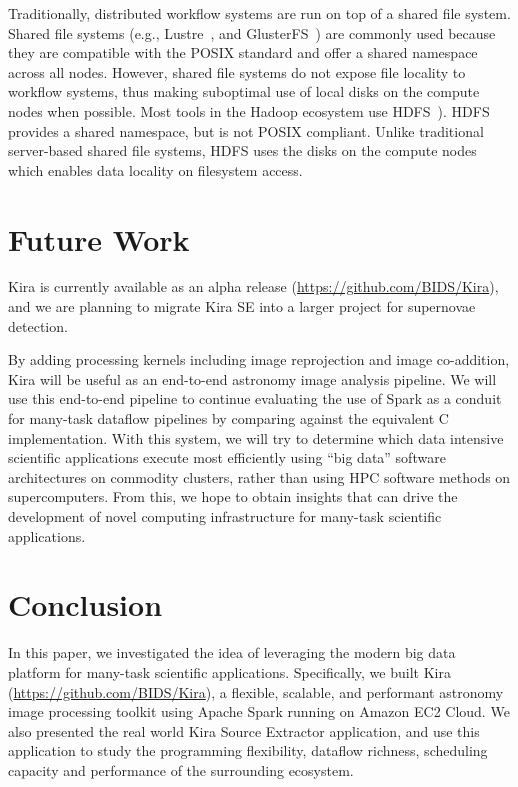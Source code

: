 \documentclass[10pt,journal,compsoc]{IEEEtran}
\begin{document}
Traditionally, distributed workflow systems are run on top of a shared file system. 
Shared file systems (e.g., Lustre~\cite{donovan03}, and
GlusterFS~\cite{davies13}) are commonly used because they are compatible with the POSIX
standard and offer a shared namespace across all nodes. However, shared file systems
do not expose file locality to workflow systems, thus making suboptimal use of local
disks on the compute nodes when possible. Most tools in the Hadoop ecosystem use
HDFS~\cite{shvachko10}). HDFS  provides a shared namespace, but is not POSIX
compliant. Unlike traditional server-based shared file systems, HDFS uses
the disks on the compute nodes which enables data locality on filesystem access.

\section{Future Work}
\label{sec:Future}
Kira is currently available as an alpha release (\url{https://github.com/BIDS/Kira}), 
and we are planning to migrate Kira SE into a larger project for supernovae detection.

By adding processing kernels including image reprojection and image co-addition, Kira will be
useful as an end-to-end astronomy image analysis pipeline. We will use this end-to-end pipeline
to continue evaluating the use of Spark as a conduit for many-task dataflow pipelines by
comparing against the equivalent C implementation. With this system, we will try to determine
which data intensive scientific applications execute most efficiently using ``big data''
software architectures on commodity clusters, rather than using HPC software methods on supercomputers.
From this, we hope to obtain insights that can drive the development of novel computing
infrastructure for many-task scientific applications.

\section{Conclusion}
\label{sec:Conclusion}

In this paper, we investigated the idea of leveraging the modern big data platform for many-task
scientific applications. Specifically, we built Kira (\url{https://github.com/BIDS/Kira}), a flexible, scalable,
and performant astronomy image processing toolkit using Apache Spark running on Amazon EC2 Cloud. We also presented
the real world Kira Source Extractor application, and use this application to study the programming
flexibility, dataflow richness, scheduling capacity and performance of the surrounding ecosystem.
\end{document}
